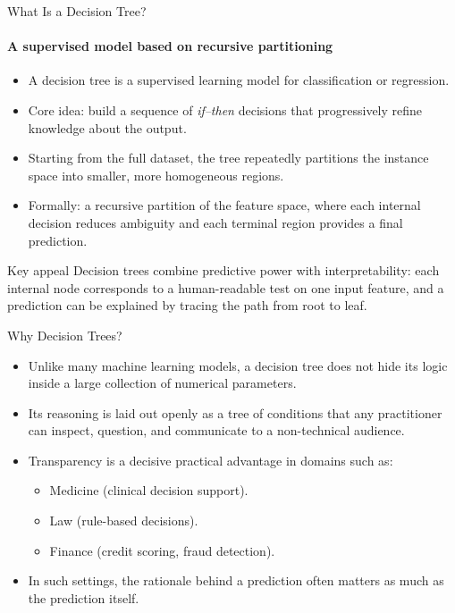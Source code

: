 \begin{frame}{What Is a Decision Tree?}
  \framesubtitle{A supervised model based on recursive partitioning}
  \begin{itemize}
    \item A \alert{decision tree} is a supervised learning model for classification or regression.
    \item Core idea: build a sequence of \emph{if--then} decisions that progressively refine
          knowledge about the output.
    \item Starting from the full dataset, the tree \alert{repeatedly partitions} the instance space
          into smaller, more homogeneous regions.
    \item Formally: a \alert{recursive partition} of the feature space, where each internal decision
          reduces ambiguity and each terminal region provides a final prediction.
  \end{itemize}
  \begin{block}{Key appeal}
    Decision trees combine \alert{predictive power} with \alert{interpretability}: each internal
    node corresponds to a human-readable test on one input feature, and a prediction can be
    explained by tracing the path from root to leaf.
  \end{block}
\end{frame}

\begin{frame}{Why Decision Trees?}
  \begin{itemize}
    \item Unlike many machine learning models, a decision tree does \alert{not hide its logic}
          inside a large collection of numerical parameters.
    \item Its reasoning is laid out openly as a \alert{tree of conditions} that any practitioner
          can inspect, question, and communicate to a non-technical audience.
    \item Transparency is a decisive practical advantage in domains such as:
      \begin{itemize}
        \item Medicine (clinical decision support).
        \item Law (rule-based decisions).
        \item Finance (credit scoring, fraud detection).
      \end{itemize}
    \item In such settings, the \alert{rationale} behind a prediction often matters as much as
          the prediction itself.
  \end{itemize}
\end{frame}

